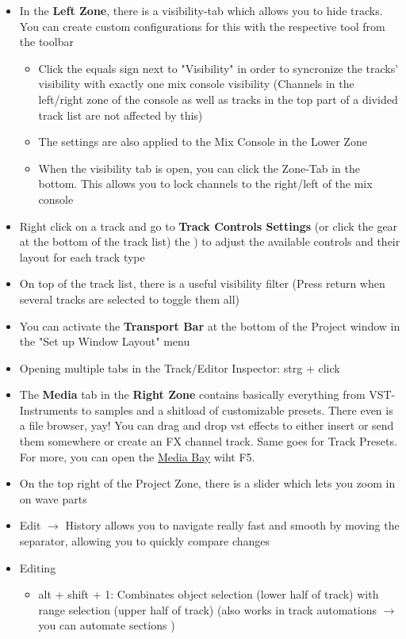 \documentclass[10pt]{article}
\begin{document}
\begin{itemize}
	\item In the \textbf{Left Zone}, there is a visibility-tab which allows you to hide tracks. You can create custom configurations for this with the respective tool from the toolbar
	\begin{itemize}
		\item Click the equals sign next to "Visibility" in order to syncronize the tracks' visibility with exactly one mix console visibility (Channels in the left/right zone of the console as well as tracks in the top part of a divided track list are not affected by this)
		\item The settings are also applied to the Mix Console in the Lower Zone
		\item When the visibility tab is open, you can click the Zone-Tab in the bottom. This allows you to lock channels to the right/left of the mix console
	\end{itemize}
	\item Right click on a track and go to \textbf{Track Controls Settings} (or click the gear at the bottom of the track list) the ) to adjust the available controls and their layout for each track type
	\item On top of the track list, there is a useful visibility filter (Press return when several tracks are selected to toggle them all)
	\item You can activate the \textbf{Transport Bar} at the bottom of the Project window in the "Set up Window Layout" menu
	\item Opening multiple tabs in the Track/Editor Inspector: strg + click
	\item The \hypertarget{MediaTap}{\textbf{Media} tab} in the \textbf{Right Zone} contains basically everything from VST-Instruments to samples and a shitload of customizable presets. There even is a file browser, yay! You can drag and drop vst effects to either insert or send them somewhere or create an FX channel track. Same goes for Track Presets. For more, you can open the \hyperlink{MediaBay}{Media Bay} wiht F5.
	\item On the top right of the Project Zone, there is a slider which lets you zoom in on wave parts
	\item Edit $\rightarrow$ History allows you to navigate really fast and smooth by moving the separator, allowing you to quickly compare changes
	\item Editing
	\begin{itemize}
		\item alt + shift + 1: Combinates object selection (lower half of track) with range selection (upper half of track) (also works in track automations $\rightarrow$ you can automate sections	)

\end{itemize}
\end{itemize}
\end{document}
